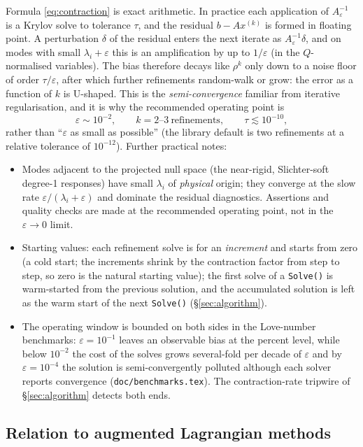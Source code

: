 \documentclass[11pt]{article}
\newcommand{\eps}{\varepsilon}
\begin{document}
Formula \eqref{eq:contraction} is exact arithmetic. In practice each
application of $A_{\eps}^{-1}$ is a Krylov solve to tolerance $\tau$,
and the residual $b - A x^{(k)}$ is formed in floating point. A
perturbation $\delta$ of the residual enters the next iterate as
$A_{\eps}^{-1}\delta$, and on modes with small $\lambda_{i} + \eps$
this is an amplification by up to $1/\eps$ (in the $Q$-normalised
variables). The bias therefore decays like $\rho^{k}$ only down to a
noise floor of order $\tau/\eps$, after which further refinements
random-walk or grow: the error as a function of $k$ is U-shaped. This
is the \emph{semi-convergence} familiar from iterative regularisation,
and it is why the recommended operating point is
\begin{equation}
  \eps \sim 10^{-2}, \qquad k = 2\text{--}3 \ \text{refinements},
  \qquad \tau \lesssim 10^{-10} ,
\end{equation}
rather than ``$\eps$ as small as possible'' (the library default is
two refinements at a relative tolerance of $10^{-12}$). Further
practical notes:
\begin{itemize}
\item Modes adjacent to the projected null space (the near-rigid,
  Slichter-soft degree-1 responses) have small $\lambda_{i}$ of
  \emph{physical} origin; they converge at the slow rate
  $\eps/(\lambda_{i}+\eps)$ and dominate the residual diagnostics.
  Assertions and quality checks are made at the recommended operating
  point, not in the $\eps \to 0$ limit.
\item Starting values: each refinement solve is for an
  \emph{increment} and starts from zero (a cold start; the increments
  shrink by the contraction factor from step to step, so zero is the
  natural starting value); the first solve of a
  \texttt{Solve()} is warm-started from the previous solution, and the
  accumulated solution is left as the warm start of the next
  \texttt{Solve()} (\S\ref{sec:algorithm}).
\item The operating window is bounded on both sides in the
  Love-number benchmarks: $\eps = 10^{-1}$ leaves an observable bias at
  the percent level, while below $10^{-2}$ the cost of the solves grows
  several-fold per decade of $\eps$ and by $\eps = 10^{-4}$ the solution
  is semi-convergently polluted although each solver reports
  convergence (\texttt{doc/benchmarks.tex}). The contraction-rate
  tripwire of \S\ref{sec:algorithm} detects both ends.
\end{itemize}

\subsection{Relation to augmented Lagrangian methods}
\end{document}

